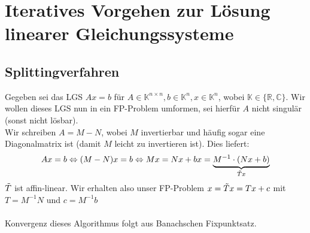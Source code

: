 \section{Iteratives Vorgehen zur Lösung linearer Gleichungssysteme}
\subsection{Splittingverfahren}
Gegeben sei das LGS $Ax=b$ für $A\in\mathbb{K}^{n\times n}, b\in\mathbb{K}^n, x\in\mathbb{K}^n$, 
wobei $\mathbb{K}\in\{\mathbb{R}, \mathbb{C}\}$. Wir wollen dieses LGS nun in ein FP-Problem umformen, 
sei hierfür $A$ nicht singulär (sonst nicht lösbar). \\
Wir schreiben $A=M-N$, wobei $M$ invertierbar und häufig sogar eine Diagonalmatrix ist 
(damit $M$ leicht zu invertieren ist). Dies liefert:
\[Ax = b \Leftrightarrow (M-N)x=b \Leftrightarrow Mx=Nx+b x=\underbrace{M^{-1}\cdot(Nx+b)}_{\Tilde{T}x}\]
$\Tilde{T}$ ist affin-linear. Wir erhalten also unser FP-Problem $x=\Tilde{T}x=Tx+c$ 
mit $T=M^{-1}N$ und $c=M^{-1}b$ \\ \\

Konvergenz dieses Algorithmus folgt aus Banachschen Fixpunktsatz.

